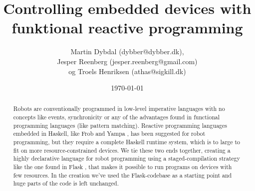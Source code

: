 \documentclass[a4paper,oneside, draft]{memoir}
\title{Controlling embedded devices with funktional reactive programming}
\author{Martin Dybdal (dybber@dybber.dk), \\
Jesper Reenberg (jesper.reenberg@gmail.com) \\ og
Troels Henriksen (athas@sigkill.dk)}
\date{\today}
\begin{document}
\maketitle

\begin{abstract}
  Robots are conventionally programmed in low-level imperative
  languages with no concepts like events, synchronicity or any of the
  advantages found in functional programming languages (like pattern
  matching). Reactive programming languages embedded in Haskell, like
  Frob \cite{frob99} and Yampa \cite{arrowsrobotsfrp02}, has been
  suggested for robot programming, but they require a complete Haskell
  runtime system, which is to large to fit on more
  resource-constrained devices. We tie these two ends together,
  creating a highly declarative language for robot programming using a
  staged-compilation strategy like the one found in Flask
  \cite{flask08}, that makes it possible to run programs on devices
  with few resources. In the creation we've used the Flask-codebase as
  a starting point and huge parts of the code is left unchanged.
\end{abstract}
\end{document}

